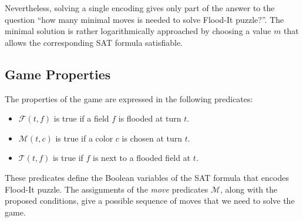 \documentclass[conference]{IEEEtran}
\newcommand{\quotes}[1]{``#1''}
\newcommand{\nMoves}{\ensuremath{m}\xspace}
\newcommand{\clr}{\ensuremath{c}\xspace}
\newcommand{\flood}[2]{\ensuremath{\mathcal{F}(#1,#2)}\xspace}
\newcommand{\move}[2]{\ensuremath{\mathcal{M}(#1,#2)}\xspace}
\newcommand{\touch}[2]{\ensuremath{\mathcal{T}(#1,#2)}\xspace}
\newcommand{\turn}{\ensuremath{t}\xspace}
\newcommand{\field}{\ensuremath{f}\xspace}
\begin{document}
Nevertheless, solving a single encoding gives only part of the answer to the question \quotes{how many minimal moves is needed to solve Flood-It puzzle?}. The minimal solution is rather logarithmically approached by choosing a value \nMoves that allows the corresponding SAT formula satisfiable.
\subsection{Game Properties}
The properties of the game are expressed in the following predicates: 
\begin{itemize}
	\item \flood{\turn}{\field} is true if a field \field is flooded at turn \turn. 
	\item \move{\turn}{\clr} is true if a color \clr is chosen at turn \turn. 
	\item \touch{\turn}{\field} is true if \field is next to a flooded field at \turn. 
\end{itemize}

These predicates define the Boolean variables of the SAT formula that encodes Flood-It puzzle. The assignments of the \emph{move} predicates $\mathcal{M}$, along with the proposed conditions, give a possible sequence of moves that we need to solve the game. 
\end{document}
